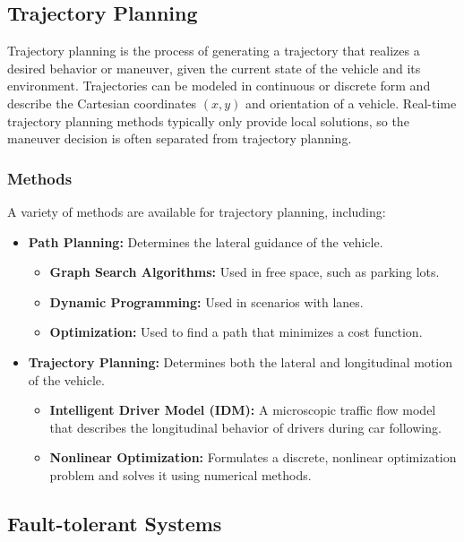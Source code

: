 \subsection{Trajectory Planning}
Trajectory planning is the process of generating a trajectory that realizes a desired behavior or maneuver, given the current state of the vehicle and its environment. Trajectories can be modeled in continuous or discrete form and describe the Cartesian coordinates $(x, y)$ and orientation of a vehicle. Real-time trajectory planning methods typically only provide local solutions, so the maneuver decision is often separated from trajectory planning.

\subsubsection*{Methods}
A variety of methods are available for trajectory planning, including:
\begin{itemize}
    \item \textbf{Path Planning:} Determines the lateral guidance of the vehicle.
          \begin{itemize}
              \item \textbf{Graph Search Algorithms:} Used in free space, such as parking lots.
              \item \textbf{Dynamic Programming:} Used in scenarios with lanes.
              \item \textbf{Optimization:} Used to find a path that minimizes a cost function.
          \end{itemize}
    \item \textbf{Trajectory Planning:} Determines both the lateral and longitudinal motion of the vehicle.
          \begin{itemize}
              \item \textbf{Intelligent Driver Model (IDM):} A microscopic traffic flow model that describes the longitudinal behavior of drivers during car following.
              \item \textbf{Nonlinear Optimization:} Formulates a discrete, nonlinear optimization problem and solves it using numerical methods.
          \end{itemize}
\end{itemize}

\subsection{Fault-tolerant Systems}


